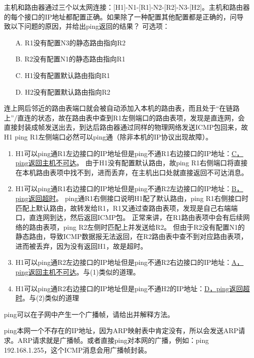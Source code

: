 \begin{example}
	主机和路由器通过三个以太网连接：[H1]-N1-[R1]-N2-[R2]-N3-[H2]。主机和路由器的每个接口的IP地址都配置正确。如果除了一种配置其他配置都是正确的，问导致以下问题的原因，并给出ping返回的结果？
	可选项：
	\begin{itemize}
		\item [A.]R1没有配置N3的静态路由指向R2
		\item [B.]R2没有配置N1的静态路由指向R1
		\item [C.]H1没有配置默认路由指向R1
		\item [D.]H2没有配置默认路由指向R2
	\end{itemize}
\end{example}
\begin{analysis}
	连上网后邻近的路由表端口就会被自动添加入本机的路由表，而且处于“在链路上”/直连的状态，故在路由表中查到R1左侧端口的路由表项，发现是直连网，会直接封装成帧发送出去，到达后路由器通过同样的物理网络发送ICMP包回来，故H1 ping R1左侧端口必然可以ping通（除非本机的IP协议出现故障）。
	\begin{enumerate}
	\item H1可以ping通R1左边接口的IP地址但是ping不通R1右边接口的IP地址：\underline{C，ping返回主机不可达}。
	由于H1没有配置默认路由，故ping R1右侧端口将直接在本机路由表项中找不到，进而丢弃，在主机出口处就直接返回不可达消息。
	\item H1可以ping通R1右边接口的IP地址但是ping不通R2左边接口的IP地址：\underline{B，ping返回超时}。
	ping通R1右侧接口说明H1配了默认路由，ping R1右侧接口时匹配上默认路由，故转发给R1，R1又通过查路由表项，发现是自己右端端口，直连网到达，然后返回ICMP包。
	正常来讲，在R1路由表项中会有后续网络的路由表项，ping R2左侧时匹配上并发送给R2。
	但由于R2没有配置N1的静态路由，导致ICMP数据报无法返回，在R2路由表中查不到对应路由表项，进而被丢弃，因为没有返回H1，故是超时。
	\item H1可以ping通R2左边接口的IP地址但是ping不通R2右边接口的IP地址：\underline{A，ping返回主机不可达}。与(1)类似的道理。
	\item H1可以ping通R2右边接口的IP地址但是ping不通H2的IP地址：\underline{D，ping返回超时}。与(2)类似的道理
	\end{enumerate}
\end{analysis}

\begin{example}
	ping可以在子网中产生一个广播帧，请给出并解释方法。
\end{example}
\begin{analysis}
	ping本网一个不存在的IP地址，因为ARP映射表中肯定没有，所以会发送ARP请求。ARP请求就是广播帧。或者直接ping对本网的广播，例如：ping 192.168.1.255，这个ICMP消息会用广播帧封装。
\end{analysis}

